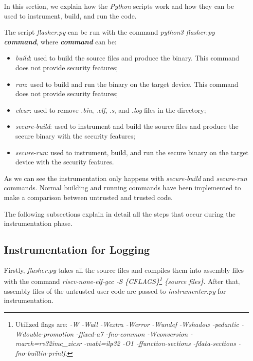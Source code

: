 In this section, we explain how the \textit{Python} scripts work and how they
can be used to instrument, build, and run the code.

The script \textit{flasher.py} can be run with the command \textit{python3
flasher.py \textbf{command}}, where \textit{\textbf{command}} can be:
\begin{itemize}[noitemsep]
  \item \textit{build}: used to build the source files and produce the binary.
    This command does not provide security features;

  \item \textit{run}: used to build and run the binary on the target device.
    This command does not provide security features;

  \item \textit{clear}: used to remove \textit{.bin}, \textit{.elf}, \textit{.s},
    and \textit{.log} files in the directory;

  \item \textit{secure-build}: used to instrument and build the source files and
    produce the secure binary with the security features;

  \item \textit{secure-run}: used to instrument, build, and run the secure binary
    on the target device with the security features.
\end{itemize}

As we can see the instrumentation only happens with \textit{secure-build} and \textit{secure-run}
commands. Normal building and running commands have been implemented to make a comparison
between untrusted and trusted code.

The following subsections explain in detail all the steps that occur during the instrumentation
phase.

\subsection{Instrumentation for Logging}
\label{subsec:logging}

Firstly, \textit{flasher.py} takes all the source files and compiles them into
assembly files with the command \textit{riscv-none-elf-gcc -S \{CFLAGS\}\footnote{Utilized
flags are: \textit{-W -Wall -Wextra -Werror -Wundef -Wshadow -pedantic -Wdouble-promotion
-ffixed-a7 -fno-common -Wconversion -march=rv32imc\_zicsr -mabi=ilp32 -O1 -ffunction-sections
-fdata-sections -fno-builtin-printf}.} \{source files\}}. After that, assembly files
of the untrusted user code are passed to \textit{instrumenter.py} for
instrumentation.

